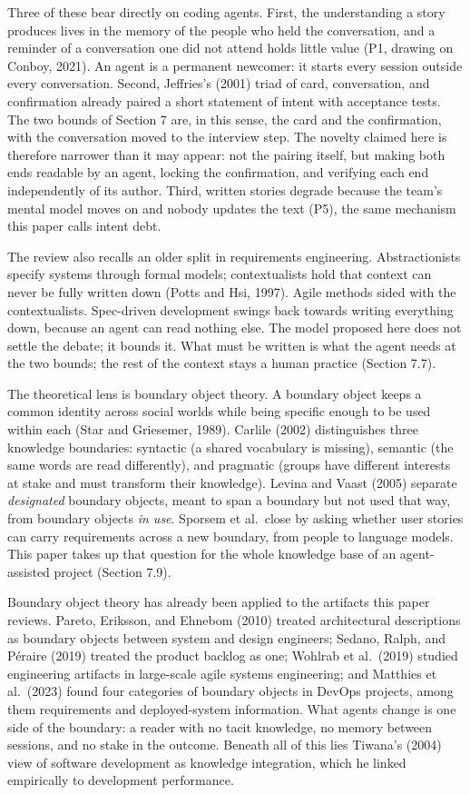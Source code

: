 \documentclass[11pt]{article}
\begin{document}
Three of these bear directly on coding agents. First, the understanding a story produces lives in the memory of the people who held the conversation, and a reminder of a conversation one did not attend holds little value (P1, drawing on Conboy, 2021). An agent is a permanent newcomer: it starts every session outside every conversation. Second, Jeffries's (2001) triad of card, conversation, and confirmation already paired a short statement of intent with acceptance tests. The two bounds of Section 7 are, in this sense, the card and the confirmation, with the conversation moved to the interview step. The novelty claimed here is therefore narrower than it may appear: not the pairing itself, but making both ends readable by an agent, locking the confirmation, and verifying each end independently of its author. Third, written stories degrade because the team's mental model moves on and nobody updates the text (P5), the same mechanism this paper calls intent debt.

The review also recalls an older split in requirements engineering. Abstractionists specify systems through formal models; contextualists hold that context can never be fully written down (Potts and Hsi, 1997). Agile methods sided with the contextualists. Spec-driven development swings back towards writing everything down, because an agent can read nothing else. The model proposed here does not settle the debate; it bounds it. What must be written is what the agent needs at the two bounds; the rest of the context stays a human practice (Section 7.7).

The theoretical lens is boundary object theory. A boundary object keeps a common identity across social worlds while being specific enough to be used within each (Star and Griesemer, 1989). Carlile (2002) distinguishes three knowledge boundaries: syntactic (a shared vocabulary is missing), semantic (the same words are read differently), and pragmatic (groups have different interests at stake and must transform their knowledge). Levina and Vaast (2005) separate \emph{designated} boundary objects, meant to span a boundary but not used that way, from boundary objects \emph{in use}. Sporsem et al.\ close by asking whether user stories can carry requirements across a new boundary, from people to language models. This paper takes up that question for the whole knowledge base of an agent-assisted project (Section 7.9).

Boundary object theory has already been applied to the artifacts this paper reviews. Pareto, Eriksson, and Ehnebom (2010) treated architectural descriptions as boundary objects between system and design engineers; Sedano, Ralph, and P\'eraire (2019) treated the product backlog as one; Wohlrab et al.\ (2019) studied engineering artifacts in large-scale agile systems engineering; and Matthies et al.\ (2023) found four categories of boundary objects in DevOps projects, among them requirements and deployed-system information. What agents change is one side of the boundary: a reader with no tacit knowledge, no memory between sessions, and no stake in the outcome. Beneath all of this lies Tiwana's (2004) view of software development as knowledge integration, which he linked empirically to development performance.
\end{document}
